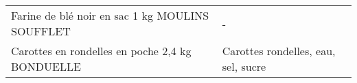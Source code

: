 \begin{longtable}{p{5cm}p{10cm}}
                                                          Farine de blé noir en sac 1 kg MOULINS SOUFFLET &                                                                                                                                                                                                                                                                                                                                                                                                                                                                                                                                                                                                                                                                                                                                                                                                                                                                                                                                                                                                                                        - \\
                                                          Carottes en rondelles en poche 2,4 kg BONDUELLE &                                                                                                                                                                                                                                                                                                                                                                                                                                                                                                                                                                                                                                                                                                                                                                                                                                                                                                                                                                                                      Carottes rondelles, eau, sel, sucre \\

\end{longtable}
